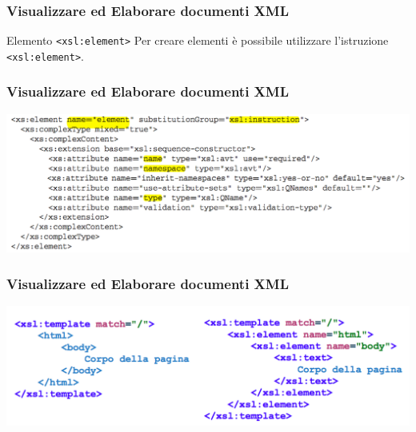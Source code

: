 \begin{frame}
    \frametitle{Visualizzare ed Elaborare documenti XML}
    \addtocounter{nframe}{1}
    

     \begin{block}{Elemento \texttt{<xsl:element>}}
        Per creare elementi è possibile utilizzare l'istruzione \texttt{<xsl:element>}.
     \end{block}

\end{frame}

\begin{frame}
    \frametitle{Visualizzare ed Elaborare documenti XML}
    \addtocounter{nframe}{1}
    
    \begin{center}
        \includegraphics[width=.9\textwidth]{imgs/Schema-element.png}
    \end{center}

\end{frame}

\begin{frame}
    \frametitle{Visualizzare ed Elaborare documenti XML}
    \addtocounter{nframe}{1}
    
    \begin{center}
        \includegraphics[width=.9\textwidth]{imgs/element-example.png}
    \end{center}

\end{frame}


